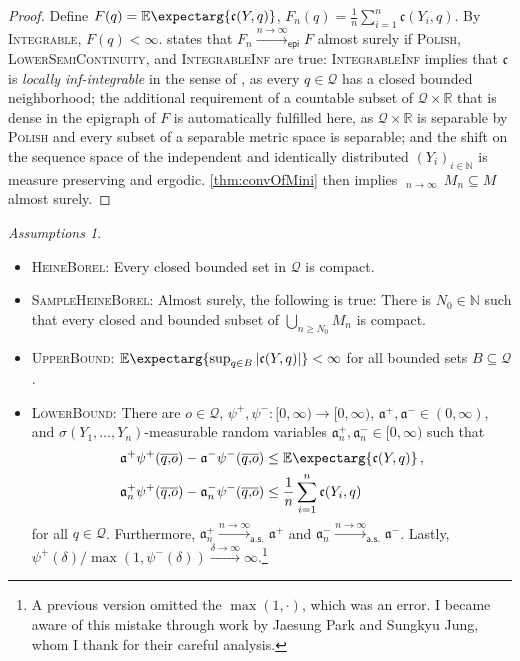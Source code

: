 \documentclass{scrartcl}
\renewcommand{\subset}{\subseteq}
\newcommand{\Ex}{\E\expectarg}
\newcommand*{\mc}[1]{\mathcal{#1}}
\newcommand*{\ms}[1]{\mathsf{#1}}
\newcommand*{\mf}[1]{\mathfrak{#1}}
\newcommand{\N}{\mathbb{N}}
\newcommand{\R}{\mathbb{R}}
\newcommand{\equationComma}{\, ,}
\newcommand{\eqcm}{\equationComma}
\DeclareMathOperator*{\outerlim}{lim\, \overline{sup}}
\theoremstyle{plain}\newtheorem{theorem}{Theorem}[section]
\theoremstyle{definition}
\theoremstyle{remark}
\newtheorem{assumptions}[theorem]{Assumptions}
\begin{document}
\begin{proof}
Define $F(q) = \Ex{\mf c(Y, q)}$, $F_n(q) = \frac1n\sum_{i=1}^n \mf c(Y_i, q)$. By \textsc{Integrable}, $F(q)<\infty$.
\cite[Theorem 8.2]{korf01} states that $F_n \xrightarrow{n\to\infty}_{\ms{epi}} F$ almost surely if \textsc{Polish}, \textsc{LowerSemiContinuity}, and \textsc{IntegrableInf} are true: \textsc{IntegrableInf} implies that $\mf c$ is \textit{locally inf-integrable} in the sense of \cite[Definition 4.2]{korf01}, as every $q\in\mc Q$ has a closed bounded neighborhood; the additional requirement of a countable subset of $\mc Q \times \R$ that is dense in the epigraph of $F$ is automatically fulfilled here, as $\mc Q\times\R$ is separable by \textsc{Polish} and every subset of a separable metric space is separable; and the shift on the sequence space of the independent and identically distributed $(Y_i)_{i\in\N}$ is measure preserving and ergodic. \autoref{thm:convOfMini} then implies $\outerlim_{n\to\infty}\, M_n \subset M$ almost surely.
\end{proof}
\begin{assumptions}\mbox{ }
\begin{itemize}
	\item \textsc{HeineBorel}: Every closed bounded set in $\mc Q$ is compact.
	\item \textsc{SampleHeineBorel}: Almost surely, the following is true: There is $N_0\in\N$ such that every closed and bounded subset of $\bigcup_{n\geq N_0} M_n$ is compact.
	\item \textsc{UpperBound}: $\Ex{\sup_{q\in B} \abs{\mf c(Y,q)}} < \infty$ for all bounded sets $B\subset\mc Q$.
	\item \textsc{LowerBound}: There are $o\in\mc Q$, $\psi^+, \psi^- \colon [0,\infty) \to [0,\infty)$, $\mf a^+, \mf a^- \in(0,\infty)$, and $\sigma(Y_1, \dots, Y_n)$-measurable random variables $\mf a^+_n, \mf a^-_n \in[0,\infty)$ such that 
	\begin{align*}
		\mf a^+ \psi^+(\ol qo) - \mf a^- \psi^-(\ol qo) &\leq \Ex{\mf c(Y, q)}
		\eqcm\\
		\mf a^+_n \psi^+(\ol qo) - \mf a^-_n \psi^-(\ol qo) &\leq \frac1n \sum_{i=1}^n \mf c(Y_i, q)
	\end{align*}
	for all $q\in\mc Q$. Furthermore, $\mf a^+_n\xrightarrow{n\to\infty}_{\ms{a.s.}}\mf a^+$ and $\mf a^-_n\xrightarrow{n\to\infty}_{\ms{a.s.}}\mf a^-$. Lastly, $\psi^+(\delta)/\max(1, \psi^-(\delta))\xrightarrow{\delta\to\infty}\infty$.\footnote{A previous version omitted the $\max(1,\cdot)$, which was an error. I became aware of this mistake through work by Jaesung Park and Sungkyu Jung, whom I thank for their careful analysis.}
	\end{itemize}
\end{assumptions}
\end{document}
